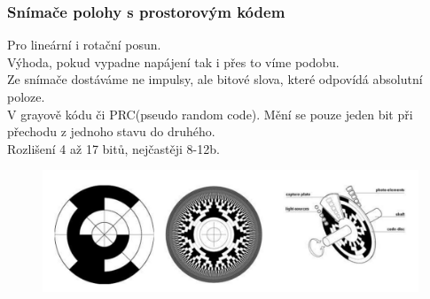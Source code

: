 \subsubsection{Snímače polohy s prostorovým kódem}
Pro lineární i rotační posun.\\
Výhoda, pokud vypadne napájení tak i přes to víme podobu.\\
Ze snímače dostáváme ne impulsy, ale bitové slova, které odpovídá absolutní poloze.\\
V grayově kódu či PRC(pseudo random code). Mění se pouze jeden bit při přechodu z jednoho stavu do druhého.\\
Rozlišení 4 až 17 bitů, nejčastěji 8-12b.\\
\begin{figure}[h!]
    \centering
    \includegraphics[scale = 0.2]{img/ProstKod.png}
\end{figure}

